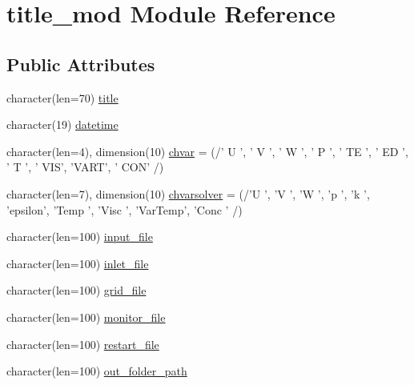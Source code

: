 \hypertarget{classtitle__mod}{\section{title\-\_\-mod Module Reference}
\label{classtitle__mod}
}
\subsection*{Public Attributes}
\begin{DoxyCompactItemize}
\item 
character(len=70) \hyperlink{classtitle__mod_a16d499c2271f74325813048133f6b947}{title}
\item 
character(19) \hyperlink{classtitle__mod_a8b3004768211b65f2678ca209f6672ba}{datetime}
\item 
character(len=4), dimension(10) \hyperlink{classtitle__mod_aab37de0b88867f1916ce8cfc289e98dc}{chvar} = (/' U ', ' V ', ' W ', ' P ', ' T\-E ', ' E\-D ', ' T ', ' V\-I\-S', 'V\-A\-R\-T', ' C\-O\-N' /)
\item 
character(len=7), dimension(10) \hyperlink{classtitle__mod_a9472f9f42179093e161523ad2b634549}{chvarsolver} = (/'U ', 'V ', 'W ', 'p ', 'k ', 'epsilon', 'Temp ', 'Visc ', 'Var\-Temp', 'Conc ' /)
\item 
character(len=100) \hyperlink{classtitle__mod_a64fc03558006dbdf36a10564ba2afc89}{input\-\_\-file}
\item 
character(len=100) \hyperlink{classtitle__mod_a3e8a85e3cce2b0de36e3f09052cd502c}{inlet\-\_\-file}
\item 
character(len=100) \hyperlink{classtitle__mod_a998c71ccbb4580eb3b5e1bac6ec581d0}{grid\-\_\-file}
\item 
character(len=100) \hyperlink{classtitle__mod_a0c25de734abd2098468902978c3b1171}{monitor\-\_\-file}
\item 
character(len=100) \hyperlink{classtitle__mod_a7994996b990659c9df719ca4ba2aaf5f}{restart\-\_\-file}
\item 
character(len=100) \hyperlink{classtitle__mod_af12af9d69b3792960354c4f2b3a9a955}{out\-\_\-folder\-\_\-path}
\end{DoxyCompactItemize}


